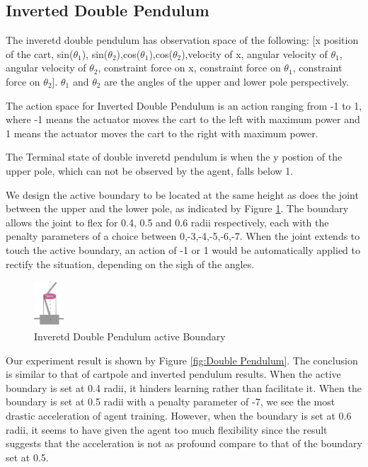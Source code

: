 \documentclass[journal]{IEEEtran}
\begin{document}
\subsection{Inverted Double Pendulum}
The inveretd double pendulum has observation space of the following: [x position of the cart, sin($\theta_1$), sin($\theta_2$),cos($\theta_1$),cos($\theta_2$),velocity of x, angular velocity of $\theta_1$, angular velocity of $\theta_2$, constraint force on x, constraint force on $\theta_1$, constraint force on $\theta_2$]. $\theta_1$ and $\theta_2$ are the angles of the upper and lower pole perspectively.

The action space for Inverted Double Pendulum is an action ranging from -1 to 1, where -1 means the actuator moves the cart to the left with maximum power and 1 means the actuator moves the cart to the right with maximum power.

The Terminal state of double inveretd pendulum is when the y postion of the upper pole, which can not be observed by the agent, falls below 1.

We design the active boundary to be located at the same height as does the joint between the upper and the lower pole, as indicated by Figure \ref{fig:doublePB}. The boundary allows the joint to flex for 0.4, 0.5 and 0.6 radii respectively, each with the penalty parameters of a choice between 0,-3,-4,-5,-6,-7. When the joint extends to touch the active boundary, an action of -1 or 1 would be automatically applied to rectify the situation, depending on the sigh of the angles.

\begin{figure}
     \centering
      \includegraphics[width=0.1\textwidth]{cartpole2.png}
      \caption{Inveretd Double Pendulum active Boundary}
      \label{fig:doublePB}
\end{figure}

Our experiment result is shown by Figure \ref{fig:Double Pendulum}. The conclusion is similar to that of cartpole and inverted pendulum results. When the active boundary is set at 0.4 radii, it hinders learning rather than facilitate it. When the boundary is set at 0.5 radii with a penalty parameter of -7, we see the most drastic acceleration of agent training. However, when the boundary is set at 0.6 radii, it seems to have given the agent too much flexibility since the result suggests that the acceleration is not as profound compare to that of the boundary set at 0.5.
\end{document}
